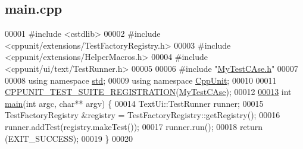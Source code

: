 \hypertarget{main_8cpp_source}{}\subsection{main.\+cpp}

\begin{DoxyCode}
00001 \textcolor{preprocessor}{#include <cstdlib>}
00002 \textcolor{preprocessor}{#include <cppunit/extensions/TestFactoryRegistry.h>}
00003 \textcolor{preprocessor}{#include <cppunit/extensions/HelperMacros.h>}
00004 \textcolor{preprocessor}{#include <cppunit/ui/text/TestRunner.h>}
00005 
00006 \textcolor{preprocessor}{#include "\hyperlink{_my_test_c_ase_8h}{MyTestCAse.h}"}
00007 
00008 \textcolor{keyword}{using namespace }\hyperlink{namespacestd}{std};
00009 \textcolor{keyword}{using namespace }\hyperlink{namespace_cpp_unit}{CppUnit};
00010 
00011 \hyperlink{main_8cpp_ae3c11e07cb88d99e84a6deb3ca988152_ae3c11e07cb88d99e84a6deb3ca988152}{CPPUNIT\_TEST\_SUITE\_REGISTRATION}(\hyperlink{class_my_test_c_ase}{MyTestCAse});
00012 
\hypertarget{main_8cpp_source.tex_l00013}{}\hyperlink{main_8cpp_a3c04138a5bfe5d72780bb7e82a18e627_a3c04138a5bfe5d72780bb7e82a18e627}{00013} \textcolor{keywordtype}{int} \hyperlink{main_8cpp_a3c04138a5bfe5d72780bb7e82a18e627_a3c04138a5bfe5d72780bb7e82a18e627}{main}(\textcolor{keywordtype}{int} argc, \textcolor{keywordtype}{char}** argv) \{
00014     TextUi::TestRunner runner;
00015     TestFactoryRegistry  &registry = TestFactoryRegistry::getRegistry();
00016     runner.addTest(registry.makeTest());
00017     runner.run();
00018     \textcolor{keywordflow}{return} (EXIT\_SUCCESS);
00019 \}
00020 
\end{DoxyCode}
